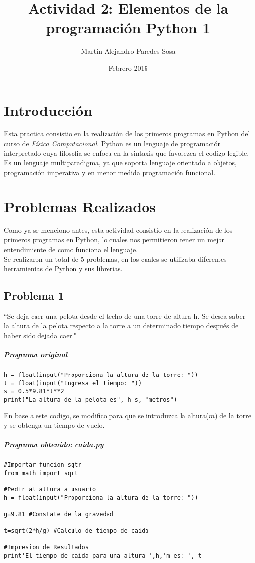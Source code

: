 \documentclass[12pt]{article}
\title{Actividad 2: Elementos de la programación Python 1}
\author{Martin Alejandro Paredes Sosa}
\date{Febrero 2016}
\begin{document}
\maketitle

\section{Introducción}
Esta practica consistio en la realización de los primeros programas en Python del curso de \textit{Física Computacional}. Python es un lenguaje de programación interpretado cuya filosofia se enfoca en la sintaxis que favorezca el codigo legible. Es un lenguaje multiparadigma, ya que soporta lenguaje orientado a objetos, programación imperativa y en menor medida programación funcional. \cite{PyWiki}


\section{Problemas Realizados}

Como ya se menciono antes, esta actividad consistio en la realización de los primeros programas en Python, lo cuales nos permitieron tener un mejor entendimiente de como funciona el lenguaje.\\

Se realizaron un total de 5 problemas, en los cuales se utilizaba diferentes herramientas de Python y sus librerias.

\subsection{Problema 1}

``Se deja caer una pelota desde el techo de una torre de altura h. Se desea saber la altura de la pelota respecto a la torre a un determinado tiempo después de haber sido dejada caer."\cite{act}

\subparagraph*{Programa original}

\begin{verbatim}
h = float(input("Proporciona la altura de la torre: "))
t = float(input("Ingresa el tiempo: "))
s = 0.5*9.81*t**2
print("La altura de la pelota es", h-s, "metros")
\end{verbatim}

En base a este codigo, se modifico para que se introduzca la altura($m$) de la torre y se obtenga un tiempo de vuelo.

\subparagraph*{Programa obtenido: caida.py}
\begin{verbatim}
#Importar funcion sqtr
from math import sqrt

#Pedir al altura a usuario
h = float(input("Proporciona la altura de la torre: "))

g=9.81 #Constate de la gravedad

t=sqrt(2*h/g) #Calculo de tiempo de caida

#Impresion de Resultados
print'El tiempo de caida para una altura ',h,'m es: ', t 

\end{verbatim}
\end{document}
